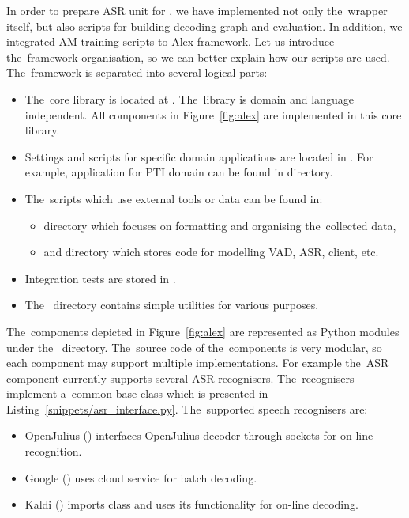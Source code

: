In order to prepare \ac{ASR} unit for , we have implemented not only the~wrapper itself, but also scripts for building decoding graph and evaluation.
In addition, we integrated \ac{AM} training scripts to Alex framework.
Let us introduce the~framework organisation, so we can better explain how our scripts are used.
The~framework is separated into several logical parts:
\begin{itemize}
    \item The~core library is located at . The~library is domain and language independent. All components in Figure~\ref{fig:alex} are implemented in this core library.
    \item Settings and scripts for specific domain applications are located in .
        For example, application for \ac{PTI} domain can be found in  directory.
    \item The~scripts which use external tools or data can be found in:
        \begin{itemize}
            \item {} directory which focuses on formatting and organising the~collected data,
            \item and \term {} directory which stores code for modelling \ac{VAD}, \ac{ASR},  client, etc.
        \end{itemize}
    \item Integration tests are stored in .
    \item The~ directory contains simple utilities for various purposes.
\end{itemize}

The~components depicted in Figure~\ref{fig:alex} are represented as Python modules under the~ directory.
The~source code of the~components is very modular, so each component may support multiple implementations.
For example the~\ac{ASR} component currently supports several \ac{ASR} recognisers.
The~recognisers implement a~common base class  which is presented in Listing~\ref{snippets/asr_interface.py}.
The~supported speech recognisers are:
\begin{itemize}
    \item OpenJulius () interfaces OpenJulius decoder through sockets for on-line recognition.
    \item Google () uses cloud service for batch decoding.
    \item Kaldi () imports  class and uses its functionality for on-line decoding.
\end{itemize}

